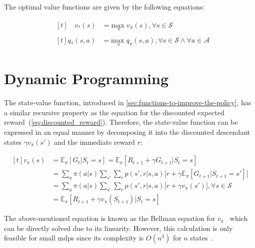 \documentclass[draft,final]{vutinfth} %
\newcommand{\pautoref}[1]{(\autoref{#1})}
\newcommand{\p}[1]{see p. #1}
\begin{document}
    The optimal value functions are given by the following equations:

    \begin{align}
        &\begin{aligned}[t]
             \phantom{,a}v_*(s) &= \underset{\pi}{\text{max }}v_\pi(s), \forall s \in \mathcal{S}\label{eq:optimal1}
        \end{aligned}\\
        &\begin{aligned}[t]
             q_*(s,a) &= \underset{\pi}{\text{max }}q_\pi(s,a), \forall s \in \mathcal{S} \land \forall a \in \mathcal{A}\label{eq:optimal2}
        \end{aligned}
    \end{align}


    \section{Dynamic Programming}

    The state-value function, introduced in \autoref{sec:functions-to-improve-the-policy}, has a similar recursive property as the equation for the discounted expected reward~\pautoref{eq:discounted_reward}.
    Therefore, the state-value function can be expressed in an equal manner by decomposing it into the discounted descendant states $\gamma v_\pi(s')$ and the immediate reward $r$:

    \begin{equation}
        \begin{aligned}[t]
            v_\pi(s) &= \mathbb{E}_\pi[G_t|S_t=s] = \mathbb{E}_\pi[R_{t+1} + \gamma G_{t+1}|S_t=s] \\
            &  =  \sum_{a} \pi(a|s) \sum_{s'}\sum_{r} p(s',r|s,a) \bigg[r + \gamma \mathbb{E}_\pi[G_{t+1}|S_{t+1} = s'] \bigg] \\
            &  =  \sum_{a} \pi(a|s) \sum_{s'}\sum_{r} p(s',r|s,a) \bigg[r + \gamma v_{\pi}(s') \bigg], \forall s \in \mathcal{S} \\
            &  =  \mathbb{E}_\pi[R_{t+1} + \gamma v_\pi(S_{t+1})|S_t=s]
            \label{eq:bellman_equation}
        \end{aligned}
    \end{equation}

    The above-mentioned equation is known as the Bellman equation for $v_\pi$~\citep[\p{59}]{sutton_reinforcement_2018} which can be directly solved due to its linearity.
    However, this calculation is only feasible for small \glspl{mdp} since its complexity is $O(n^3)$ for $n$ states~.
\end{document}
